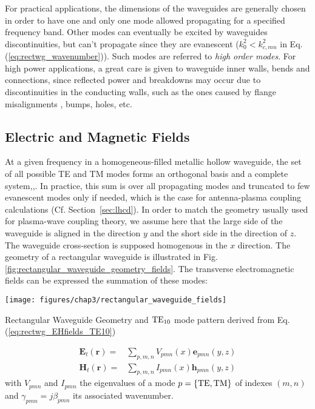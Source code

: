 For practical applications, the dimensions of the waveguides are generally chosen in order to have one and only one mode allowed propagating for a specified frequency band. Other modes can eventually be excited by waveguides discontinuities, but can’t propagate since they are evanescent ($k^2_0 < k_{c,mn}^2$ in Eq.(\ref{eq:rectwg_wavenumber})). Such modes are referred to \textit{high order modes}. For high power applications, a great care is given to waveguide inner walls, bends and connections, since reflected power and breakdowns may occur due to discontinuities in the conducting walls, such as the ones caused by flange misalignments , bumps, holes, etc.

\subsection{Electric and Magnetic Fields}
At a given frequency in a homogeneous-filled metallic hollow waveguide, the set of all possible TE and TM modes forms an orthogonal basis and a complete system\cite[§1.2]{marcuvitz1951},\cite[§5.2]{Collin1990},\cite[§8.2]{Harrington2001}. In practice, this sum is over all propagating modes and truncated to few evanescent modes only if needed, which is the case for antenna-plasma coupling calculations (Cf. Section~\ref{sec:lhcd}). In order to match the geometry usually used for plasma-wave coupling theory, we assume here that the large side of the waveguide is aligned in the direction $y$ and the short side in the direction of $z$. The waveguide cross-section is supposed homogenous in the $x$ direction. The geometry of a rectangular waveguide is illustrated in Fig.\ref{fig:rectangular_waveguide_geometry_fields}. The transverse electromagnetic fields can be expressed the summation of these modes:

\begin{marginfigure}[0cm]
	\texttt{[image: figures/chap3/rectangular\_waveguide\_fields]}
	\caption{Rectangular Waveguide Geometry and ${\mathrm{TE}}_{10}$ mode pattern derived from Eq.(\ref{eq:rectwg_EHfields_TE10})}
	\label{fig:rectangular_waveguide_geometry_fields}
\end{marginfigure}

\begin{subequations}
	\begin{align}
\mathbf{E}_{t}(\mathbf{r}) = & \sum_{p,m,n} V_{pmn}(x)\mathbf{e}_{pmn} (y,z)
\label{eq:E_guides_somme_modes}\\
\mathbf{H}_{t}(\mathbf{r}) = & \sum_{p,m,n} I_{pmn}(x)\mathbf{h}_{pmn} (y,z)
\label{eq:H_guides_somme_modes}
	\end{align}
\label{eq:rectwg_transverse_fields_sum_modes}
\end{subequations}
with $V_{pmn}$ and $I_{pmn}$ the eigenvalues of a mode $p=\{{\mathrm{TE}},{\mathrm{TM}}\}$ of indexes $(m,n)$ and $\gamma_{pmn}=j\beta_{pmn}$ its associated wavenumber. 

